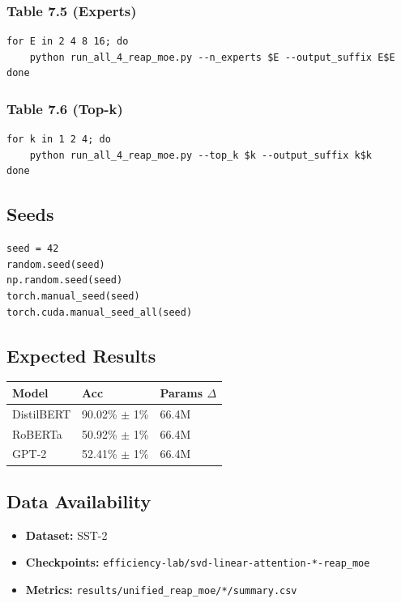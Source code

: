 \subsubsection{Table 7.5 (Experts)}
\begin{lstlisting}
for E in 2 4 8 16; do
    python run_all_4_reap_moe.py --n_experts $E --output_suffix E$E
done
\end{lstlisting}

\subsubsection{Table 7.6 (Top-k)}
\begin{lstlisting}
for k in 1 2 4; do
    python run_all_4_reap_moe.py --top_k $k --output_suffix k$k
done
\end{lstlisting}

\subsection{Seeds}

\begin{lstlisting}
seed = 42
random.seed(seed)
np.random.seed(seed)
torch.manual_seed(seed)
torch.cuda.manual_seed_all(seed)
\end{lstlisting}

\subsection{Expected Results}

\begin{table}[H]
\centering
\small
\begin{tabular}{lll}
\toprule
\textbf{Model} & \textbf{Acc} & \textbf{Params $\Delta$} \\
\midrule
DistilBERT & 90.02\% $\pm$ 1\% & 66.4M \\
RoBERTa & 50.92\% $\pm$ 1\% & 66.4M \\
GPT-2 & 52.41\% $\pm$ 1\% & 66.4M \\
\bottomrule
\end{tabular}
\end{table}

\subsection{Data Availability}

\begin{itemize}
\item \textbf{Dataset:} SST-2
\item \textbf{Checkpoints:} \texttt{efficiency-lab/svd-linear-attention-*-reap\_moe}
\item \textbf{Metrics:} \texttt{results/unified\_reap\_moe/*/summary.csv}

\end{itemize}
